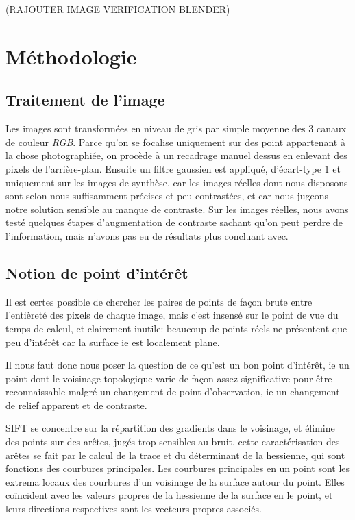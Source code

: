 \documentclass[
	a4paper, %
	10pt, %
	unnumberedsections, %
	twoside, %
]{LTJournalArticle}
\begin{document}
(RAJOUTER IMAGE VERIFICATION BLENDER)

\section{Méthodologie}

\subsection{Traitement de l'image}
Les images sont transformées en niveau de gris par simple moyenne des $3$ canaux de couleur \textit{RGB}.
Parce qu'on se focalise uniquement sur des point appartenant à la chose photographiée, on procède
à un recadrage manuel dessus en enlevant des pixels de l'arrière-plan. Ensuite un filtre gaussien est
appliqué, d'écart-type $1$ et uniquement sur les images de synthèse, car les images réelles
dont nous disposons sont selon nous suffisamment précises et peu contrastées,
et car nous jugeons notre solution sensible au manque de contraste.
Sur les images réelles, nous avons testé quelques étapes d'augmentation
de contraste sachant qu'on peut perdre de l'information, mais n'avons pas eu
de résultats plus concluant avec.

\subsection{Notion de point d'intérêt}

Il est certes possible de chercher les paires de points de façon brute entre
l'entièreté des pixels de chaque image, mais c'est insensé sur le
point de vue du temps de calcul, et clairement inutile: beaucoup de
points réels ne présentent que peu d'intérêt car la surface ie est
localement plane.

Il nous faut donc nous poser la question de ce qu'est un bon point
d'intérêt, ie un point dont le voisinage topologique varie de façon
assez significative pour être reconnaissable malgré un changement de
point d'observation, ie un changement de relief apparent et de contraste.

SIFT se concentre sur la répartition des gradients
dans le voisinage, et élimine des points sur des arêtes, jugés trop
sensibles au bruit, cette caractérisation des arêtes se fait par
le calcul de la trace et du déterminant de la hessienne,
qui sont fonctions des courbures principales.
Les courbures principales en un point sont les extrema locaux des courbures d'un voisinage de la surface
autour du point. Elles
coïncident avec les valeurs propres de la hessienne de la surface en le point,
et leurs directions respectives sont les vecteurs propres associés.
\end{document}
